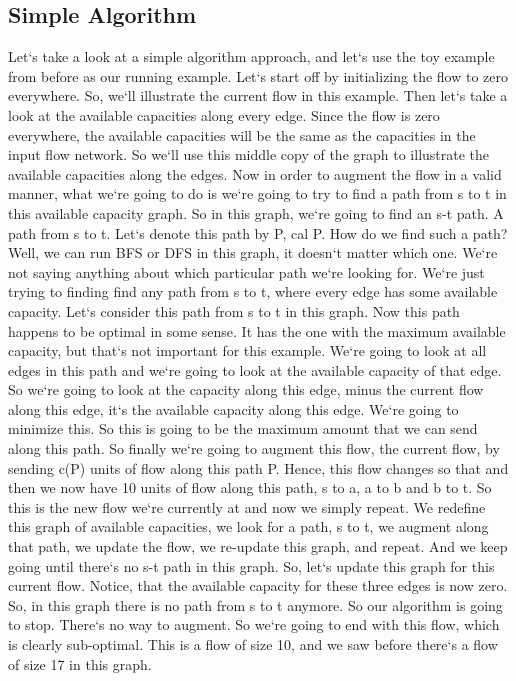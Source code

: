 \subsection{Simple Algorithm}
Let`s take a look at a simple algorithm approach, and let`s use the toy example from before as our running example.
Let`s start off by initializing the flow to zero everywhere.
So, we`ll illustrate the current flow in this example.
Then let`s take a look at the available capacities along every edge.
Since the flow is zero everywhere, the available capacities will be the same as the capacities in the input flow network.
So we`ll use this middle copy of the graph to illustrate the available capacities along the edges.
Now in order to augment the flow in a valid manner, what we`re going to do is we`re going to try to find a path from s to t in this available capacity graph.
So in this graph, we`re going to find an s-t path.
A path from s to t.
Let`s denote this path by P, cal P\@.
How do we find such a path? Well, we can run BFS or DFS in this graph, it doesn`t matter which one.
We`re not saying anything about which particular path we`re looking for.
We`re just trying to finding find any path from s to t, where every edge has some available capacity.
Let`s consider this path from s to t in this graph.
Now this path happens to be optimal in some sense.
It has the one with the maximum available capacity, but that`s not important for this example.
We`re going to look at all edges in this path and we`re going to look at the available capacity of that edge.
So we`re going to look at the capacity along this edge, minus the current flow along this edge, it`s the available capacity along this edge.
We`re going to minimize this.
So this is going to be the maximum amount that we can send along this path.
So finally we`re going to augment this flow, the current flow, by sending c(P) units of flow along this path P\@.
Hence, this flow changes so that and then we now have 10 units of flow along this path, s to a, a to b and b to t.
So this is the new flow we`re currently at and now we simply repeat.
We redefine this graph of available capacities, we look for a path, s to t, we augment along that path, we update the flow, we re-update this graph, and repeat.
And we keep going until there`s no s-t path in this graph.
So, let`s update this graph for this current flow.
Notice, that the available capacity for these three edges is now zero.
So, in this graph there is no path from s to t anymore.
So our algorithm is going to stop.
There`s no way to augment.
So we`re going to end with this flow, which is clearly sub-optimal.
This is a flow of size 10, and we saw before there`s a flow of size 17 in this graph.

